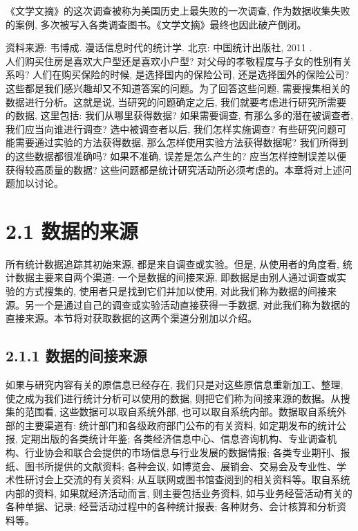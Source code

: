 \documentclass[10pt]{article}
\begin{document}
\begin{CJK*}{UTF8}{bsmi}
\begin{enumerate}
\end{enumerate}

《文学文摘》的这次调查被称为美国历史上最失败的一次调查, 作为数据收集失败的案例, 多次被写入各类调查图书。《文学文摘》最终也因此破产倒闭。

资料来源: 韦博成. 漫话信息时代的统计学. 北京: 中国统计出版社, 2011 .\\
人们购买住房是喜欢大户型还是喜欢小户型? 对父母的孝敬程度与子女的性别有关系吗? 人们在购买保险的时候, 是选择国内的保险公司, 还是选择国外的保险公司? 这些都是我们感兴趣却又不知道答案的问题。为了回答这些问题, 需要搜集相关的数据进行分析。这就是说, 当研究的问题确定之后, 我们就要考虑进行研究所需要的数据, 这里包括: 我们从哪里获得数据? 如果需要调查, 有那么多的潜在被调查者, 我们应当向谁进行调查? 选中被调查者以后, 我们怎样实施调查? 有些研究问题可能需要通过实验的方法获得数据, 那么怎样使用实验方法获得数据呢? 我们所得到的这些数据都很准确吗? 如果不准确, 误差是怎么产生的? 应当怎样控制误差以便获得较高质量的数据? 这些问题都是统计研究活动所必须考虑的。本章将对上述问题加以讨论。

\section*{2.1 数据的来源}
所有统计数据追踪其初始来源, 都是来自调查或实验。但是, 从使用者的角度看, 统计数据主要来自两个渠道: 一个是数据的间接来源, 即数据是由别人通过调查或实验的方式搜集的, 使用者只是找到它们并加以使用, 对此我们称为数据的间接来源。另一个是通过自己的调查或实验活动直接获得一手数据, 对此我们称为数据的直接来源。本节将对获取数据的这两个渠道分别加以介绍。

\subsection*{2.1.1 数据的间接来源}
如果与研究内容有关的原信息已经存在, 我们只是对这些原信息重新加工、整理, 使之成为我们进行统计分析可以使用的数据, 则把它们称为间接来源的数据。从搜集的范围看, 这些数据可以取自系统外部, 也可以取自系统内部。数据取自系统外部的主要渠道有: 统计部门和各级政府部门公布的有关资料, 如定期发布的统计公报, 定期出版的各类统计年鉴; 各类经济信息中心、信息咨询机构、专业调查机构、行业协会和联合会提供的市场信息与行业发展的数据情报; 各类专业期刊、报纸、图书所提供的文献资料; 各种会议, 如博览会、展销会、交易会及专业性、学术性研讨会上交流的有关资料; 从互联网或图书馆查阅到的相关资料等。取自系统内部的资料, 如果就经济活动而言, 则主要包括业务资料, 如与业务经营活动有关的各种单据、记录; 经营活动过程中的各种统计报表; 各种财务、会计核算和分析资料等。


\end{CJK*}
\end{document}
